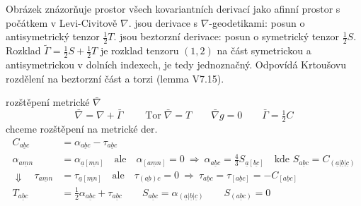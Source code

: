 \begin{vysvetleni}
Obrázek znázorňuje prostor všech kovariantních derivací jako afinní prostor s počátkem v Levi-Civitově $\nabla$.  jsou derivace s $\nabla$-geodetikami: posun o antisymetrický tenzor $\tfrac12T$.  jsou beztorzní derivace: posun o symetrický tenzor $\tfrac12S$. Rozklad $\tilde\Gamma=\tfrac12S+\tfrac12T$ je rozklad tenzoru $(1,2)$ na část symetrickou a antisymetrickou v dolních indexech, je tedy jednoznačný. Odpovídá Krtoušovu rozdělení na beztorzní část a torzi (lemma V7.15).
\end{vysvetleni}

rozštěpení metrické $\bar\nabla$
\[
  \bar\nabla = \nabla + \bar\Gamma \qquad \operatorname{Tor}\bar\nabla = T \qquad \bar\nabla g = 0 \qquad \bar\Gamma = \tfrac12 C
\]
chceme rozštěpení na metrické der.
\begin{align*}
  C_{\underline{abc}} &= \alpha_{\underline{abc}} - \tau_{\underline{abc}} \\
  \alpha_{\underline{amn}} &= \alpha_{\underline{a}[\underline{mn}]} \quad \text{ale}\quad \alpha_{[\underline{amn}]} = 0
     \ \Rightarrow\ \alpha_{\underline{abc}} = \tfrac43 S_{\underline{a}[\underline{bc}]} \quad\text{kde } S_{\underline{abc}} = C_{(\underline{a}|\underline{b}|\underline{c})} \\
  \Downarrow\quad \tau_{\underline{amn}} &= \tau_{\underline{a}[\underline{mn}]} \quad \text{ale}\quad \tau_{(\underline{ab})c} = 0
     \ \Rightarrow\ \tau_{\underline{abc}} = \tau_{[\underline{abc}]} = -C_{[\underline{abc}]} \\
  T_{\underline{abc}} &= \tfrac12\alpha_{\underline{abc}} + \tau_{\underline{abc}} \qquad S_{\underline{abc}} = \alpha_{(\underline{a}|\underline{b}|\underline{c})} \qquad S_{(\underline{abc})} = 0
\end{align*}

